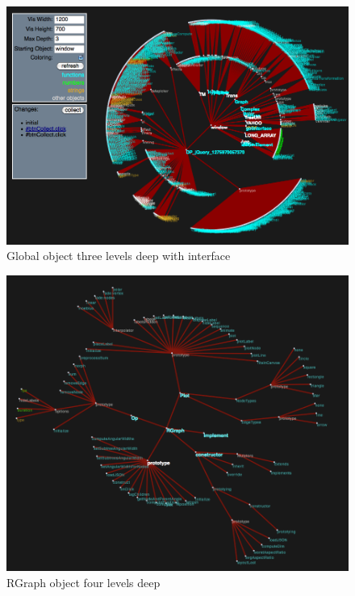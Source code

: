 \documentclass[]{article}
\begin{document}
\begin{figure}[h]
  \begin{center}
    \includegraphics[scale=.2]{interface.png}
  \end{center}
  \caption{Global object three levels deep with interface}
  \label{fig:interface}
\end{figure}

\begin{figure}[h]
  \begin{center}
    \includegraphics[scale=.2]{rgraph.png}
  \end{center}
  \caption{RGraph object four levels deep}
  \label{fig:rgraph}
\end{figure}
\end{document}
